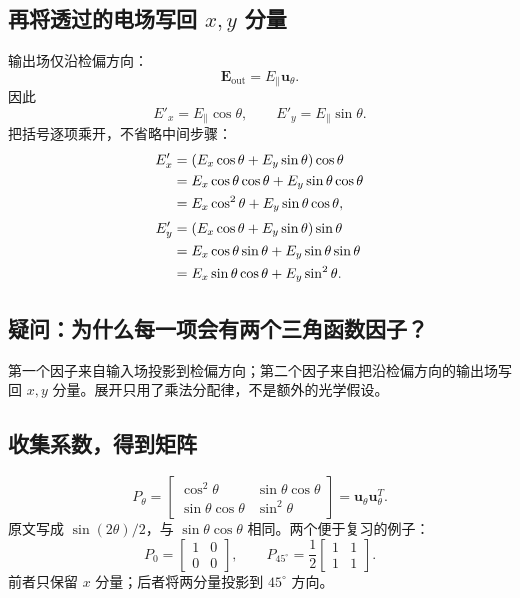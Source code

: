 \documentclass[UTF8,fontset=fandol,11pt,a4paper]{ctexart}
\newcommand{\quest}[2]{\subsection*{疑问：#1}#2}
\begin{document}
\subsection{再将透过的电场写回 $x,y$ 分量}
输出场仅沿检偏方向：
\begin{equation}
\mathbf E_{\mathrm{out}}=E_\parallel\mathbf u_\theta.
\end{equation}
因此
\begin{equation}
E'_x=E_\parallel\cos\theta,\qquad
E'_y=E_\parallel\sin\theta.
\end{equation}
把括号逐项乘开，不省略中间步骤：
\begin{align}
E'_x
&=(E_x\cos\theta+E_y\sin\theta)\cos\theta\notag\\
&=E_x\cos\theta\cos\theta+E_y\sin\theta\cos\theta\notag\\
&=E_x\cos^2\theta+E_y\sin\theta\cos\theta,\\[3pt]
E'_y
&=(E_x\cos\theta+E_y\sin\theta)\sin\theta\notag\\
&=E_x\cos\theta\sin\theta+E_y\sin\theta\sin\theta\notag\\
&=E_x\sin\theta\cos\theta+E_y\sin^2\theta.
\end{align}

\quest{为什么每一项会有两个三角函数因子？}{
第一个因子来自输入场投影到检偏方向；第二个因子来自把沿检偏方向的输出场写回 $x,y$ 分量。展开只用了乘法分配律，不是额外的光学假设。}

\subsection{收集系数，得到矩阵}
\begin{equation}
\boxed{P_\theta=
\begin{bmatrix}
\cos^2\theta&\sin\theta\cos\theta\\
\sin\theta\cos\theta&\sin^2\theta
\end{bmatrix}=\mathbf u_\theta\mathbf u_\theta^T.}
\end{equation}
原文写成 $\sin(2\theta)/2$，与 $\sin\theta\cos\theta$ 相同。两个便于复习的例子：
\begin{equation}
P_0=\begin{bmatrix}1&0\\0&0\end{bmatrix},\qquad
P_{45^\circ}=\frac12\begin{bmatrix}1&1\\1&1\end{bmatrix}.
\end{equation}
前者只保留 $x$ 分量；后者将两分量投影到 $45^\circ$ 方向。
\end{document}
